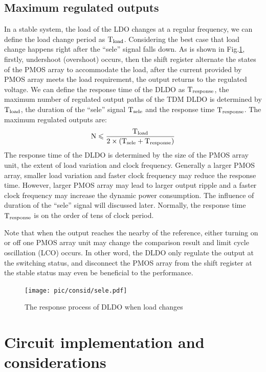\documentclass[journal]{IEEEtran}
\begin{document}
\subsection{Maximum regulated outputs}
In a stable system, the load of the LDO changes at a regular frequency, we can define the load change period as $\rm T_{load}$. Considering the best case that load change happens right after the ``sele'' signal falls down. As is shown in Fig.\ref{fig:sele}, firstly, undershoot (overshoot) occurs, then the shift register alternate the states of the PMOS array to accommodate the load, after the current provided by PMOS array meets the load requirement, the output returns to the regulated voltage. We can define the response time of the DLDO as $\rm T_{response}$, the maximum number of regulated output paths of the TDM DLDO is determined by $\rm T_{load}$, the duration of the ``sele'' signal $\rm T_{sele}$ and the response time $\rm T_{response}$. The maximum regulated outputs are:
\begin{equation}
\rm N \leqslant \frac{\rm T_{load}}{\rm 2\times(T_{sele}+T_{response})}
\end{equation}
The response time of the DLDO is determined by the size of the PMOS array unit, the extent of load variation and clock frequency. Generally a larger PMOS array, smaller load variation and faster clock frequency may reduce the response time. However, larger PMOS array may lead to larger output ripple and a faster clock frequency may increase the dynamic power consumption. The influence of duration of the ``sele'' signal will discussed later. Normally, the response time $\rm T_{response}$ is on the order of tens of clock period.

Note that when the output reaches the nearby of the reference, either turning on or off one PMOS array unit may change the comparison result and limit cycle oscillation (LCO) occurs. In other word, the DLDO only regulate the output at the switching status, and disconnect the PMOS array from the shift register at the stable status may even be beneficial to the performance.
\begin{figure}[t!]
    \centering
    \texttt{[image: pic/consid/sele.pdf]}
    \caption{The response process of DLDO when load changes}
    \label{fig:sele}
\end{figure}

\section{Circuit implementation and considerations}
\end{document}
